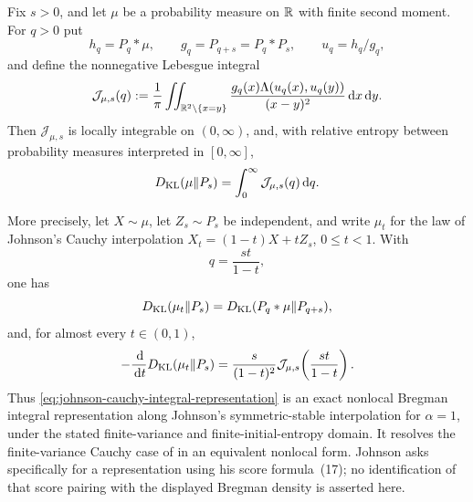 \begin{theorem}%
\label{thm:johnson-cauchy-integral-representation}
Fix \(s>0\), and let \(\mu\) be a probability measure on \(\mathbb{R}\) with finite
second moment.  For \(q>0\) put
\[
h_q=P_q*\mu,\qquad g_q=P_{q+s}=P_q*P_s,\qquad u_q=h_q/g_q,
\]
and define the nonnegative Lebesgue integral
\[
\mathcal J_{\mu,s}(q)
:=\frac1\pi\iint_{\mathbb{R}^2\setminus\{x=y\}}
\frac{g_q(x)\Lambda(u_q(x),u_q(y))}{(x-y)^2}\,\mathrm{d} x\,\mathrm{d} y .
\]
Then \(\mathcal J_{\mu,s}\) is locally integrable on \((0,\infty)\), and,
with relative entropy between probability measures interpreted in
\([0,\infty]\),
\begin{equation}\label{eq:johnson-cauchy-integral-representation}
D_{\rm KL}(\mu\|P_s)
=\int_0^\infty \mathcal J_{\mu,s}(q)\,\mathrm{d} q .
\end{equation}

More precisely, let \(X\sim\mu\), let \(Z_s\sim P_s\) be independent, and
write \(\mu_t\) for the law of Johnson's Cauchy interpolation
\(X_t=(1-t)X+tZ_s\), \(0\le t<1\).  With
\[
q=\frac{st}{1-t},
\]
one has
\begin{equation}\label{eq:johnson-cauchy-dilation-conjugacy}
D_{\rm KL}(\mu_t\|P_s)
=D_{\rm KL}(P_q*\mu\|P_{q+s}),
\end{equation}
and, for almost every \(t\in(0,1)\),
\begin{equation}\label{eq:johnson-cauchy-interpolation-derivative}
-\frac{\,\mathrm{d}}{\,\mathrm{d} t}D_{\rm KL}(\mu_t\|P_s)
=\frac{s}{(1-t)^2}
\mathcal J_{\mu,s}\!\left(\frac{st}{1-t}\right).
\end{equation}
Thus \eqref{eq:johnson-cauchy-integral-representation} is an exact nonlocal
Bregman integral representation along Johnson's symmetric-stable
interpolation for \(\alpha=1\), under the stated finite-variance and
finite-initial-entropy domain.  It resolves the finite-variance Cauchy case
of \cite[Open Problem~4]{Johnson2013StableDeBruijn} in an equivalent
nonlocal form.  Johnson asks specifically for a representation using his
score formula~(17); no identification of that score pairing with the
displayed Bregman density is asserted here.
\end{theorem}

